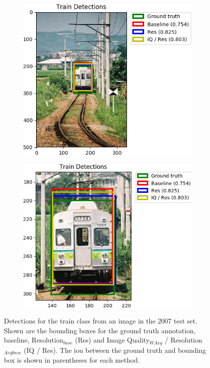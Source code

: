 \begin{figure}[H]
    \centering
    \begin{subfigure}[b]{0.45\textwidth}
        \center
        \includegraphics[width=\textwidth]{Figs/Results/000002_res.png}
        \caption{}\label{fig:}
    \end{subfigure}
    \begin{subfigure}[b]{0.45\textwidth}
        \center
        \includegraphics[width=\textwidth]{Figs/Results/000002_reszoom.png}
        \caption{}\label{fig:}
    \end{subfigure}
    \caption{Detections for the train class from an image in the 2007 test set. Shown are the bounding boxes for the ground truth annotation, baseline, Resolution$_{base}$ (Res) and Image Quality$_{WAvg}$ / Resolution$_{Avgbase}$ (IQ / Res). The \gls{iou} between the ground truth and bounding box is shown in parentheses for each method.}
    \label{fig:trainres}
\end{figure} 
 




